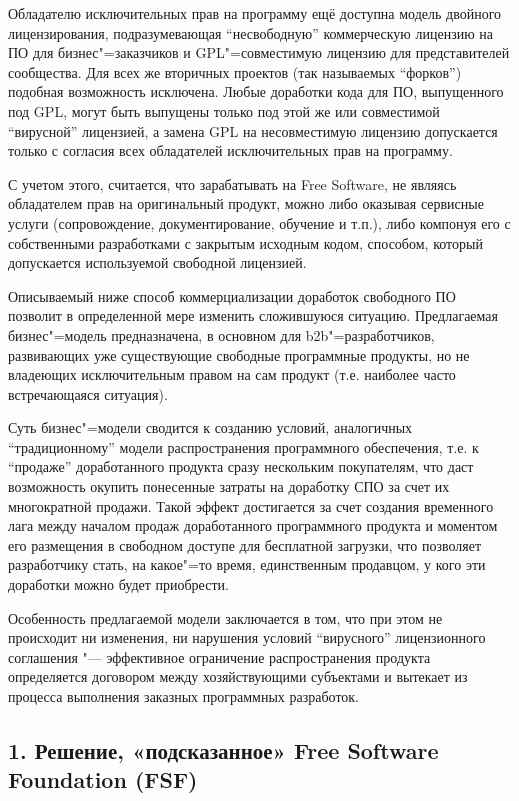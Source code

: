 \documentclass[10pt, a5paper]{article}
\begin{document}
Обладателю исключительных прав на программу ещё доступна модель двойного лицензирования, подразумевающая “несвободную” коммерческую лицензию на ПО для бизнес"=заказчиков и GPL"=совместимую лицензию  для представителей сообщества. Для всех же вторичных проектов (так называемых “форков”) подобная возможность исключена. Любые доработки кода для ПО, выпущенного под GPL, могут быть выпущены только под этой же или совместимой “вирусной” лицензией, а замена GPL на несовместимую лицензию допускается только с согласия всех обладателей исключительных прав на программу.

С учетом этого, считается, что зарабатывать на Free Software, не являясь обладателем прав на оригинальный продукт, можно либо оказывая сервисные услуги (сопровождение, документирование, обучение и т.п.), либо компонуя его с собственными разработками с закрытым исходным кодом, способом, который допускается используемой свободной лицензией.

Описываемый ниже способ коммерциализации доработок свободного ПО позволит в определенной мере изменить сложившуюся ситуацию. Предлагаемая бизнес"=модель предназначена, в основном для b2b"=разработчиков, развивающих уже существующие свободные программные продукты, но не владеющих исключительным правом на сам продукт (т.е. наиболее часто встречающаяся ситуация).

Суть бизнес"=модели сводится к созданию условий, аналогичных “традиционному” модели распространения программного обеспечения, т.е. к “продаже” доработанного продукта сразу нескольким покупателям, что даст возможность окупить понесенные затраты на доработку СПО за счет их многократной продажи. Такой эффект достигается за счет создания временного лага между началом продаж доработанного программного продукта и моментом его размещения в свободном доступе для бесплатной загрузки, что позволяет разработчику стать, на какое"=то время, единственным продавцом, у кого эти доработки можно будет приобрести.

Особенность предлагаемой модели заключается в том, что при этом не происходит ни изменения, ни нарушения условий “вирусного” лицензионного соглашения "--- эффективное ограничение распространения продукта определяется договором между хозяйствующими субъектами и вытекает из процесса выполнения заказных программных разработок.

\subsection*{1. Решение, «подсказанное» Free Software \linebreak Foundation (FSF)}
\end{document}
